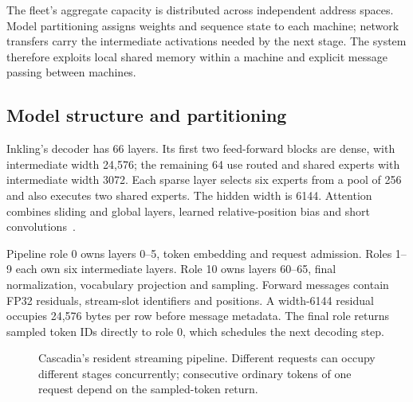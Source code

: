 \documentclass[11pt]{article}
\begin{document}
The fleet's aggregate capacity is distributed across independent address spaces. Model partitioning assigns weights and sequence state to each machine; network transfers carry the intermediate activations needed by the next stage. The system therefore exploits local shared memory within a machine and explicit message passing between machines.

\subsection{Model structure and partitioning}
Inkling's decoder has 66 layers. Its first two feed-forward blocks are dense, with intermediate width 24,576; the remaining 64 use routed and shared experts with intermediate width 3072. Each sparse layer selects six experts from a pool of 256 and also executes two shared experts. The hidden width is 6144. Attention combines sliding and global layers, learned relative-position bias and short convolutions~\cite{inklingcard}.

Pipeline role 0 owns layers 0--5, token embedding and request admission. Roles 1--9 each own six intermediate layers. Role 10 owns layers 60--65, final normalization, vocabulary projection and sampling. Forward messages contain FP32 residuals, stream-slot identifiers and positions. A width-6144 residual occupies 24,576 bytes per row before message metadata. The final role returns sampled token IDs directly to role 0, which schedules the next decoding step.

\begin{figure}[ht]
\centering
{}
\caption{Cascadia's resident streaming pipeline. Different requests can occupy different stages concurrently; consecutive ordinary tokens of one request depend on the sampled-token return.}
\label{fig:architecture}
\end{figure}
\end{document}
